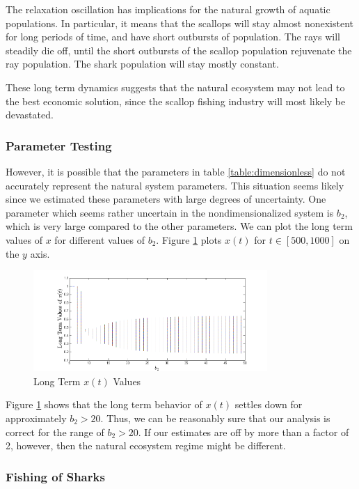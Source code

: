 \documentclass[12pt,journal,compsoc,twoside]{IEEEtran}
\begin{document}
The relaxation oscillation has implications for the natural growth of aquatic populations. In particular, it means that the scallops will stay almost nonexistent for long periods of time, and have short outbursts of population. The rays will steadily die off, until the short outbursts of the scallop population rejuvenate the ray population. The shark population will stay mostly constant.

These long term dynamics suggests that the natural ecosystem may not lead to the best economic solution, since the scallop fishing industry will most likely be devastated. 

\subsubsection{Parameter Testing}

However, it is possible that the parameters in table \ref{table:dimensionless} do not accurately represent the natural system parameters. This situation seems likely since we estimated these parameters with large degrees of uncertainty. One parameter which seems rather uncertain in the nondimensionalized system is $b_2$, which is very large compared to the other parameters. We can plot the long term values of $x$ for different values of $b_2$. Figure \ref{longtermxt} plots $x(t)$ for $t \in [500,1000]$ on the $y$ axis.    
\begin{figure}[h!]
\centering
\includegraphics[width=3.5in]{longtermxt.png}
\caption{Long Term $x(t)$ Values}
\label{longtermxt}
\end{figure}

Figure \ref{longtermxt} shows that the long term behavior of $x(t)$ settles down for approximately $b_2 > 20$. Thus, we can be reasonably sure that our analysis is correct for the range of $b_2 > 20$. If our estimates are off by more than a factor of 2, however, then the natural ecosystem regime might be different.  

\subsubsection{Fishing of Sharks}
\end{document}
